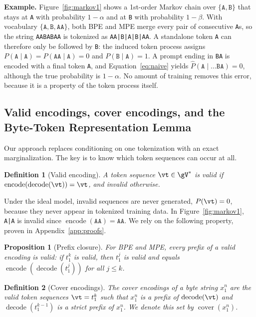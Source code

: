 \documentclass{article} %
\newtheorem{definition}{Definition}
\newtheorem{proposition}{Proposition}
\newcommand{\enc}{\operatorname{encode}}
\newcommand{\dec}{\operatorname{decode}}
\newcommand{\cover}{\operatorname{cover}}
\newcommand{\tok}[1]{\texttt{#1}}
\begin{document}
\textbf{Example.} Figure~\ref{fig:markov1} shows a 1st-order Markov chain over $\{\tok{A},\tok{B}\}$ that stays at \tok{A} with probability $1-\alpha$ and at \tok{B} with probability $1-\beta$. With vocabulary $\{\tok{A},\tok{B},\tok{AA}\}$, both BPE and MPE merge every pair of consecutive \tok{A}s, so the string \tok{AABABAA} is tokenized as \tok{AA|B|A|B|AA}. A standalone token \tok{A} can therefore only be followed by \tok{B}: the induced token process assigns $P(\tok{A}\mid\tok{A})=P(\tok{AA}\mid\tok{A})=0$ and $P(\tok{B}\mid\tok{A})=1$. A prompt ending in \tok{BA} is encoded with a final token \tok{A}, and Equation~\ref{eq:naive} yields $\hat P(\tok{A}\mid \dots\tok{BA})=0$, although the true probability is $1-\alpha$. No amount of training removes this error, because it is a property of the token process itself.

\subsection{Valid encodings, cover encodings, and the Byte-Token Representation Lemma}
\label{sec:cover}
Our approach replaces conditioning on one tokenization with an exact marginalization. The key is to know which token sequences can occur at all.

\begin{definition}[Valid encoding]
\label{def:valid}
A token sequence $\vt\in\gV^*$ is \emph{valid} if $\enc(\dec(\vt))=\vt$, and \emph{invalid} otherwise.
\end{definition}

Under the ideal model, invalid sequences are never generated, $P(\vt)=0$, because they never appear in tokenized training data. In Figure~\ref{fig:markov1}, \tok{A|A} is invalid since $\enc(\tok{AA})=\tok{AA}$. We rely on the following property, proven in Appendix~\ref{app:proofs}.

\begin{proposition}[Prefix closure]
\label{prop:prefix}
For BPE and MPE, every prefix of a valid encoding is valid: if $t_1^k$ is valid, then $t_1^j$ is valid and equals $\enc(\dec(t_1^j))$ for all $j\leq k$.
\end{proposition}

\begin{definition}[Cover encodings]
\label{def:cover}
The \emph{cover encodings} of a byte string $x_1^n$ are the valid token sequences $\vt=t_1^k$ such that $x_1^n$ is a prefix of $\dec(\vt)$ and $\dec(t_1^{k-1})$ is a strict prefix of $x_1^n$. We denote this set by $\cover(x_1^n)$.
\end{definition}
\end{document}
